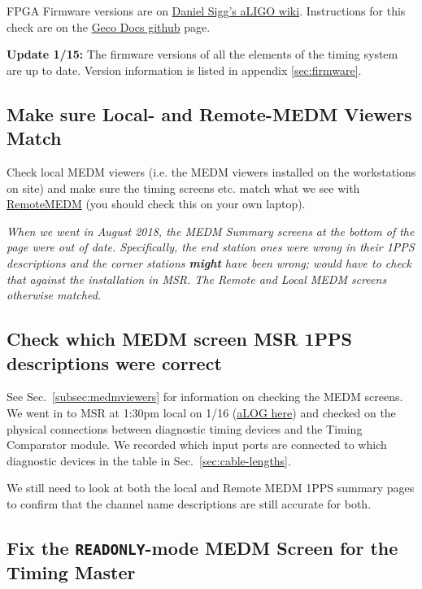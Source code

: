 \documentclass{article}
\newcommand*{\TODO}{\textcolor{todo}}
\begin{document}
FPGA Firmware versions are on \href{https://awiki.ligo-wa.caltech.edu/wiki/TimingFpgaCode}{Daniel Sigg's aLIGO wiki}. Instructions for this check are on the \href{https://github.com/stefco/geco_docs/blob/master/3-timing-fpga-code.md}{Geco Docs github} page.

\textbf{Update 1/15:} The firmware versions of all the elements of the timing system are up to date. Version information is listed in appendix \ref{sec:firmware}.

\TODO{
\subsection{\label{subsec:medmviewers} Make sure Local- and Remote-MEDM Viewers Match}
}
Check local MEDM viewers (i.e. the MEDM viewers installed on the workstations on site) and make sure the timing screens etc. match what we see with \href{https://wiki.ligo.org/RemoteAccess/RemoteEPICS}{RemoteMEDM} (you should check this on your own laptop).

\textit{When we went in August 2018, the MEDM Summary screens at the bottom of the page were out of date. Specifically, the end station ones were wrong in their 1PPS descriptions and the corner stations \textbf{might} have been wrong; would have to check that against the installation in MSR. The Remote and Local MEDM screens otherwise matched.}

\TODO{
\subsection{Check which MEDM screen MSR 1PPS descriptions were correct}
}
See Sec.~\ref{subsec:medmviewers} for information on checking the MEDM screens. We went in to MSR at 1:30pm local on 1/16 (\href{https://alog.ligo-wa.caltech.edu/aLOG/index.php?callRep=46477}{aLOG here}) and checked on the physical connections between diagnostic timing devices and the Timing Comparator module. We recorded which input ports are connected to which diagnostic devices in the table in Sec.~\ref{sec:cable-lengths}.

\TODO{We still need to look at both the local and Remote MEDM 1PPS summary pages to confirm that the channel name descriptions are still accurate for both.} 

\TODO{
\subsection{\label{sec:fix-local-medm-readonly}Fix the \texttt{READONLY}-mode MEDM Screen for the Timing Master}
}
\end{document}
